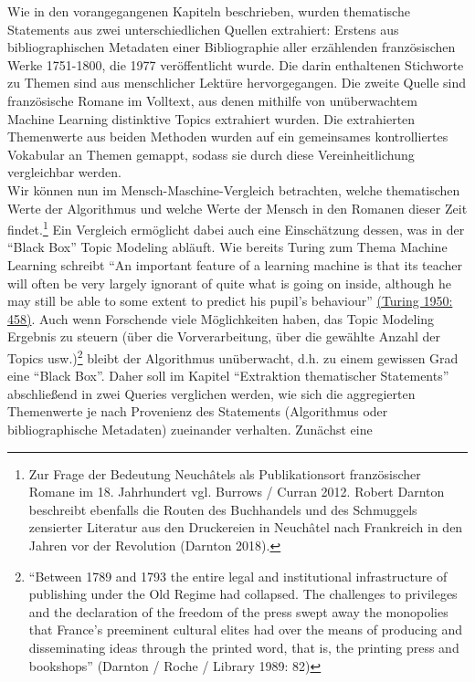 \documentclass[
  12pt,
  letterpaper,
  DIV=11,
  numbers=noendperiod]{scrreprt}
\begin{document}
Wie in den vorangegangenen Kapiteln beschrieben, wurden thematische
Statements aus zwei unterschiedlichen Quellen extrahiert: Erstens aus
bibliographischen Metadaten einer Bibliographie aller erzählenden
französischen Werke 1751-1800, die 1977 veröffentlicht wurde. Die darin
enthaltenen Stichworte zu Themen sind aus menschlicher Lektüre
hervorgegangen. Die zweite Quelle sind französische Romane im Volltext,
aus denen mithilfe von unüberwachtem Machine Learning distinktive Topics
extrahiert wurden. Die extrahierten Themenwerte aus beiden Methoden
wurden auf ein gemeinsames kontrolliertes Vokabular an Themen gemappt,
sodass sie durch diese Vereinheitlichung vergleichbar werden.\\
Wir können nun im Mensch-Maschine-Vergleich betrachten, welche
thematischen Werte der Algorithmus und welche Werte der Mensch in den
Romanen dieser Zeit findet.\footnote{Zur Frage der Bedeutung Neuchâtels
  als Publikationsort französischer Romane im 18. Jahrhundert vgl.
  Burrows / Curran 2012. Robert Darnton beschreibt ebenfalls die Routen
  des Buchhandels und des Schmuggels zensierter Literatur aus den
  Druckereien in Neuchâtel nach Frankreich in den Jahren vor der
  Revolution (Darnton 2018).} Ein Vergleich ermöglicht dabei auch eine
Einschätzung dessen, was in der ``Black Box'' Topic Modeling abläuft.
Wie bereits Turing zum Thema Machine Learning schreibt ``An important
feature of a learning machine is that its teacher will often be very
largely ignorant of quite what is going on inside, although he may still
be able to some extent to predict his pupil's behaviour''
\href{https://www.zotero.org/google-docs/?3O6e4I}{(Turing 1950: 458)}.
Auch wenn Forschende viele Möglichkeiten haben, das Topic Modeling
Ergebnis zu steuern (über die Vorverarbeitung, über die gewählte Anzahl
der Topics usw.)\footnote{``Between 1789 and 1793 the entire legal and
  institutional infrastructure of publishing under the Old Regime had
  collapsed. The challenges to privileges and the declaration of the
  freedom of the press swept away the monopolies that France's
  preeminent cultural elites had over the means of producing and
  disseminating ideas through the printed word, that is, the printing
  press and bookshops'' (Darnton / Roche / Library 1989: 82)} bleibt der
Algorithmus unüberwacht, d.h. zu einem gewissen Grad eine ``Black Box''.
Daher soll im Kapitel ``Extraktion thematischer Statements''
abschließend in zwei Queries verglichen werden, wie sich die
aggregierten Themenwerte je nach Provenienz des Statements (Algorithmus
oder bibliographische Metadaten) zueinander verhalten. Zunächst eine
\end{document}
